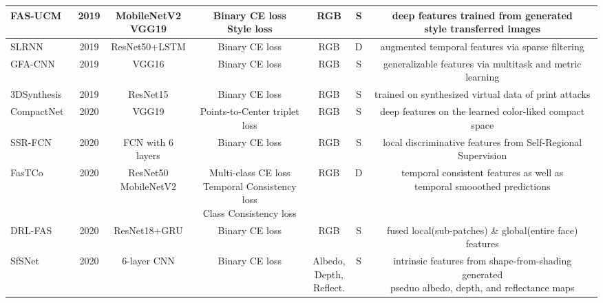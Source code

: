 \documentclass[10pt,journal,compsoc]{IEEEtran}
\begin{document}
\begin{table}
{\begin{tabular}{l c c c c c c}
   \midrule
FAS-UCM~\cite{laurensi2019style} & 2019 & \tabincell{c}{MobileNetV2\\VGG19}  & \tabincell{c}{Binary CE loss\\Style loss} & RGB & S & \tabincell{c}{deep features trained from generated \\style transferred images}  \\ 


   \midrule
 SLRNN~\cite{muhammad2019face} & 2019 & ResNet50+LSTM  & Binary CE loss & RGB & D & augmented temporal features via sparse filtering\\ 

   \midrule
GFA-CNN~\cite{tu2020learning} & 2019 & VGG16  & Binary CE loss & RGB & S & generalizable features via multitask and metric learning  \\ 

   \midrule
3DSynthesis~\cite{8987415} & 2019 & ResNet15  & Binary CE loss & RGB & S & trained on synthesized virtual data of print attacks \\   

  
  
 \midrule
 CompactNet~\cite{li2020compactnet} & 2020 & VGG19  & Points-to-Center triplet loss & RGB & S & deep features on the learned color-liked compact space\\ 

 \midrule
 SSR-FCN~\cite{deb2020look} & 2020 & FCN with 6 layers  & Binary CE loss & RGB & S & local discriminative features from Self-Regional Supervision\\

 
  \midrule
FasTCo~\cite{xu2020improving} & 2020 & \tabincell{c}{ResNet50\\MobileNetV2}  & \tabincell{c}{Multi-class CE loss\\Temporal Consistency loss\\Class Consistency loss} & RGB & D & \tabincell{c}{ temporal consistent features as well as \\temporal smooothed predictions}\\

    \midrule
 DRL-FAS~\cite{cai2020drl} & 2020 & ResNet18+GRU & Binary CE loss & RGB & S & fused local(sub-patches) \& global(entire face) features\\ 
 
   \midrule
SfSNet~\cite{pinto2020leveraging} & 2020 & 6-layer CNN  & Binary CE loss & \tabincell{c}{Albedo,\\ Depth,\\ Reflect.} & S & \tabincell{c}{ intrinsic features from shape-from-shading generated\\ pseduo albedo, depth, and reflectance maps}\\
 

\end{tabular}}
\end{table}
\end{document}
